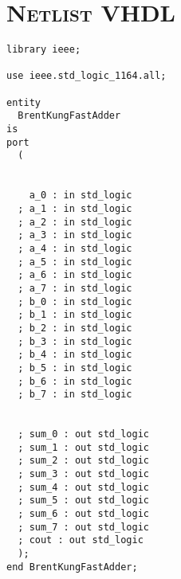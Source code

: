 \chapter{\textsc{ Netlist VHDL }}\label{vhdlNetlist}

\begin{lstlisting}
library ieee;

use ieee.std_logic_1164.all;

entity
  BrentKungFastAdder
is
port
  ( 
 
    
    a_0 : in std_logic
  ; a_1 : in std_logic
  ; a_2 : in std_logic
  ; a_3 : in std_logic
  ; a_4 : in std_logic
  ; a_5 : in std_logic
  ; a_6 : in std_logic
  ; a_7 : in std_logic
  ; b_0 : in std_logic
  ; b_1 : in std_logic
  ; b_2 : in std_logic
  ; b_3 : in std_logic
  ; b_4 : in std_logic
  ; b_5 : in std_logic
  ; b_6 : in std_logic
  ; b_7 : in std_logic

  
  ; sum_0 : out std_logic
  ; sum_1 : out std_logic
  ; sum_2 : out std_logic
  ; sum_3 : out std_logic
  ; sum_4 : out std_logic
  ; sum_5 : out std_logic
  ; sum_6 : out std_logic
  ; sum_7 : out std_logic
  ; cout : out std_logic
  );
end BrentKungFastAdder;


\end{lstlisting}
